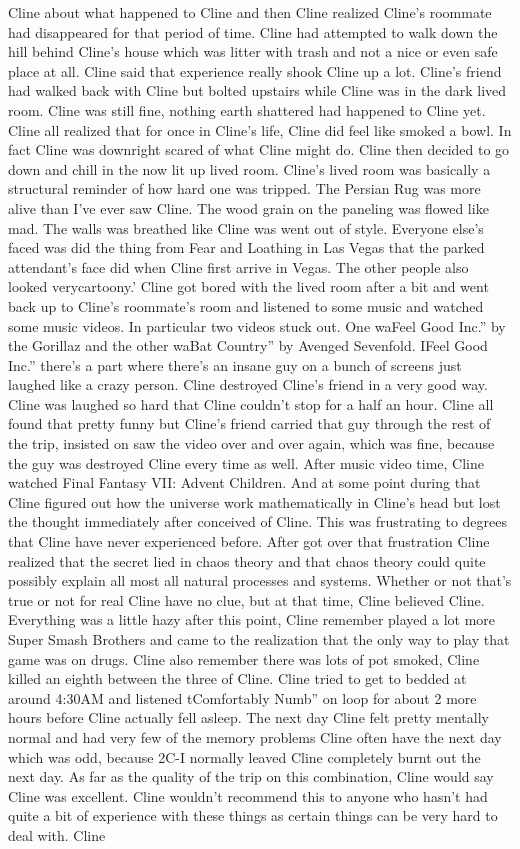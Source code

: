 \documentclass[12pt]{book}
\begin{document}
Cline about what happened to Cline and then Cline realized Cline's roommate had disappeared for that period of time. Cline had attempted to walk down the hill behind Cline's house which was litter with trash and not a nice or even safe place at all. Cline said that experience really shook Cline up a lot. Cline's friend had walked back with Cline but bolted upstairs while Cline was in the dark lived room. Cline was still fine, nothing earth shattered had happened to Cline yet. Cline all realized that for once in Cline's life, Cline did feel like smoked a bowl. In fact Cline was downright scared of what Cline might do. Cline then decided to go down and chill in the now lit up lived room. Cline's lived room was basically a structural reminder of how hard one was tripped. The Persian Rug was more alive than I've ever saw Cline. The wood grain on the paneling was flowed like mad. The walls was breathed like Cline was went out of style. Everyone else's faced was did the thing from Fear and Loathing in Las Vegas that the parked attendant's face did when Cline first arrive in Vegas. The other people also looked verycartoony.' Cline got bored with the lived room after a bit and went back up to Cline's roommate's room and listened to some music and watched some music videos. In particular two videos stuck out. One waFeel Good Inc.'' by the Gorillaz and the other waBat Country'' by Avenged Sevenfold. IFeel Good Inc.'' there's a part where there's an insane guy on a bunch of screens just laughed like a crazy person. Cline destroyed Cline's friend in a very good way. Cline was laughed so hard that Cline couldn't stop for a half an hour. Cline all found that pretty funny but Cline's friend carried that guy through the rest of the trip, insisted on saw the video over and over again, which was fine, because the guy was destroyed Cline every time as well. After music video time, Cline watched Final Fantasy VII: Advent Children. And at some point during that Cline figured out how the universe work mathematically in Cline's head but lost the thought immediately after conceived of Cline. This was frustrating to degrees that Cline have never experienced before. After got over that frustration Cline realized that the secret lied in chaos theory and that chaos theory could quite possibly explain all most all natural processes and systems. Whether or not that's true or not for real Cline have no clue, but at that time, Cline believed Cline. Everything was a little hazy after this point, Cline remember played a lot more Super Smash Brothers and came to the realization that the only way to play that game was on drugs. Cline also remember there was lots of pot smoked, Cline killed an eighth between the three of Cline. Cline tried to get to bedded at around 4:30AM and listened tComfortably Numb'' on loop for about 2 more hours before Cline actually fell asleep. The next day Cline felt pretty mentally normal and had very few of the memory problems Cline often have the next day which was odd, because 2C-I normally leaved Cline completely burnt out the next day. As far as the quality of the trip on this combination, Cline would say Cline was excellent. Cline wouldn't recommend this to anyone who hasn't had quite a bit of experience with these things as certain things can be very hard to deal with. Cline 
\end{document}

